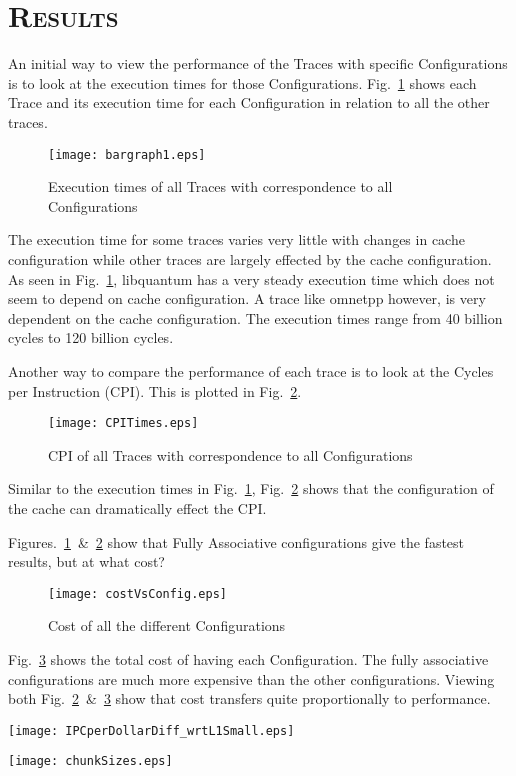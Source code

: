 \documentclass[FinalReport.tex]{subfiles}
\begin{document}
\section*{\textsc{\Large Results}}

An initial way to view the performance of the Traces with specific Configurations is to look at the execution times for those Configurations.  Fig.~\ref{fig:executiontimes} shows each Trace and its execution time for each Configuration in relation to all the other traces.
\begin{figure}[H]
\centering
\texttt{[image: bargraph1.eps]}
\caption{Execution times of all Traces with correspondence to all Configurations\label{fig:executiontimes}}
\end{figure}
The execution time for some traces varies very little with changes in cache configuration while other traces are largely effected by the cache configuration.  As seen in Fig.~\ref{fig:executiontimes}, {libquantum} has a very steady execution time which does not seem to depend on cache configuration.  A trace like {omnetpp} however, is very dependent on the cache configuration.  The execution times range from 40 billion cycles to 120 billion cycles. 

Another way to compare the performance of each trace is to look at the Cycles per Instruction (CPI).  This is plotted in Fig.~\ref{fig:CPI}.
\begin{figure}[H]
\centering
\texttt{[image: CPITimes.eps]}
\caption{CPI of all Traces with correspondence to all Configurations\label{fig:CPI}}
\end{figure}

Similar to the execution times in Fig.~\ref{fig:executiontimes}, Fig.~\ref{fig:CPI} shows that the configuration of the cache can dramatically effect the CPI. 

Figures.~\ref{fig:executiontimes}~\&~\ref{fig:CPI} show that Fully Associative configurations give the fastest results, but at what cost? 
\begin{figure}[H]
\centering
\texttt{[image: costVsConfig.eps]}
\caption{Cost of all the different Configurations\label{fig:costVsConfig}}
\end{figure}
Fig.~\ref{fig:costVsConfig} shows the total cost of having each Configuration.  The fully associative configurations are much more expensive than the other configurations.  Viewing both Fig.~\ref{fig:CPI}~\&~\ref{fig:costVsConfig} show that cost transfers quite proportionally to performance.  



\begin{center}
\texttt{[image: IPCperDollarDiff\_wrtL1Small.eps]}
\end{center}


\begin{center}
\texttt{[image: chunkSizes.eps]}
\end{center}
\end{document}
